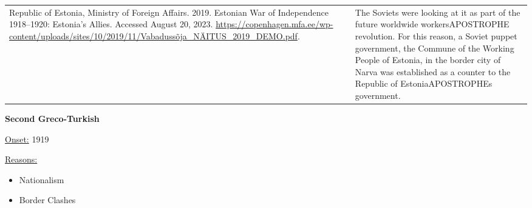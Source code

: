 {\begin{longtable}{p{}p{}}
\\
Republic of Estonia, Ministry of Foreign Affairs. 2019. Estonian War of Independence 1918–1920: Estonia’s Allies. Accessed August 20, 2023. \url{https://copenhagen.mfa.ee/wp-content/uploads/sites/10/2019/11/Vabadussõja_NÄITUS_2019_DEMO.pdf}. & The Soviets were looking at it as part of the future worldwide workersAPOSTROPHE revolution. For this reason, a Soviet puppet government, the Commune of the Working People of Estonia, in the border city of Narva was established as a counter to the Republic of EstoniaAPOSTROPHEs government.
\\
\end{longtable}}
\clearpage
         \textbf{Second Greco-Turkish} 

          \underline{Onset:} 1919         

\underline{Reasons:}
\begin{itemize}
\item Nationalism
\item Border Clashes
\end{itemize}


